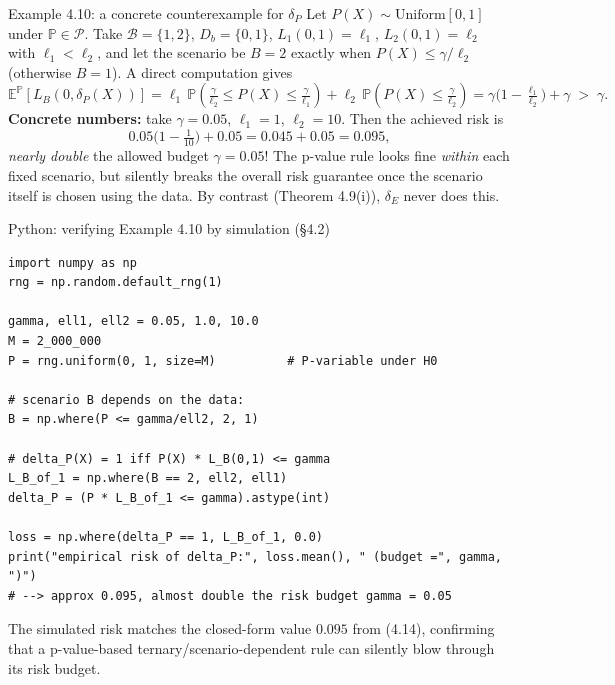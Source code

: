\documentclass[aspectratio=169,10pt]{beamer}
\begin{document}
\begin{frame}{Example 4.10: a concrete counterexample for $\delta_P$}
  Let $P(X)\sim\text{Uniform}[0,1]$ under $\mathbb P\in\mathcal P$.
  Take $\mathcal B=\{1,2\}$, $D_b=\{0,1\}$, $L_1(0,1)=\ell_1$,
  $L_2(0,1)=\ell_2$ with $\ell_1<\ell_2$, and let the scenario be
  $B=2$ exactly when $P(X)\le\gamma/\ell_2$ (otherwise $B=1$). A direct
  computation gives
  \[
    \mathbb E^{\mathbb P}[L_B(0,\delta_P(X))]
    = \ell_1\,\mathbb P\!\left(\tfrac{\gamma}{\ell_2}\le P(X)\le\tfrac{\gamma}{\ell_1}\right)
      + \ell_2\,\mathbb P\!\left(P(X)\le\tfrac{\gamma}{\ell_2}\right)
    = \gamma\Big(1-\tfrac{\ell_1}{\ell_2}\Big)+\gamma \;>\;\gamma. \tag{4.14}
  \]
  \textbf{Concrete numbers:} take $\gamma=0.05$, $\ell_1=1$, $\ell_2=10$.
  Then the achieved risk is
  \[
    0.05\Big(1-\tfrac1{10}\Big)+0.05 = 0.045+0.05 = 0.095,
  \]
  \emph{nearly double} the allowed budget $\gamma=0.05$! The p-value rule
  looks fine \emph{within} each fixed scenario, but silently breaks the
  overall risk guarantee once the scenario itself is chosen using the data.
  By contrast (Theorem 4.9(i)), $\delta_E$ never does this.
\end{frame}

\begin{frame}[fragile]{Python: verifying Example 4.10 by simulation (\S4.2)}
\begin{lstlisting}
import numpy as np
rng = np.random.default_rng(1)

gamma, ell1, ell2 = 0.05, 1.0, 10.0
M = 2_000_000
P = rng.uniform(0, 1, size=M)          # P-variable under H0

# scenario B depends on the data:
B = np.where(P <= gamma/ell2, 2, 1)

# delta_P(X) = 1 iff P(X) * L_B(0,1) <= gamma
L_B_of_1 = np.where(B == 2, ell2, ell1)
delta_P = (P * L_B_of_1 <= gamma).astype(int)

loss = np.where(delta_P == 1, L_B_of_1, 0.0)
print("empirical risk of delta_P:", loss.mean(), " (budget =", gamma, ")")
# --> approx 0.095, almost double the risk budget gamma = 0.05
\end{lstlisting}
  The simulated risk matches the closed-form value $0.095$ from (4.14),
  confirming that a p-value-based ternary/scenario-dependent rule can
  silently blow through its risk budget.
\end{frame}
\end{document}
